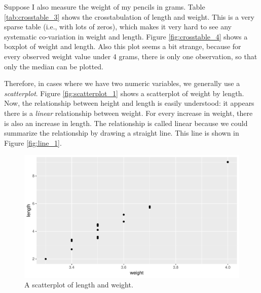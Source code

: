 \documentclass[]{report}\usepackage[]{graphicx}\usepackage[]{color}
\makeatletter
\def\maxwidth{ %
  \ifdim\Gin@nat@width>\linewidth
    \linewidth
  \else
    \Gin@nat@width
  \fi
}
\makeatother
\begin{document}
Suppose I also measure the weight of my pencils in grams. Table \ref{tab:crosstable_3} shows the crosstabulation of length and weight. This is a very sparse table (i.e., with lots of zeros), which makes it very hard to see any systematic co-variation in weight and length. Figure \ref{fig:crosstable_4} shows a boxplot of weight and length. Also this plot seems a bit strange, because for every observed weight value under 4 grams, there is only one observation, so that only the median can be plotted.


Therefore, in cases where we have two numeric variables, we generally use a \textit{scatterplot}. Figure \ref{fig:scatterplot_1} shows a scatterplot of weight by length. Now, the relationship between height and length is easily understood: it appears there is a \textit{linear} relationship between weight. For every increase in weight, there is also an increase in length. The relationship is called linear because we could summarize the relationship by drawing a straight line. This line is shown in Figure \ref{fig:line_1}.


\begin{figure}

{\centering \includegraphics[width=\maxwidth]{figure/scatter_1-1} 

}

\caption[A scatterplot of length and weight]{A scatterplot of length and weight.}\label{fig:scatter_1}
\end{figure}
\end{document}
